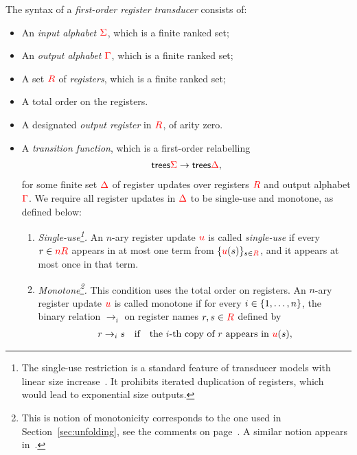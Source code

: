 \begin{definition}\label{def:stt}
The syntax of a \emph{first-order register transducer} consists of: 
\begin{itemize}
    \item An \emph{input alphabet ${\color{red}{\Sigma}}$}, which is a finite ranked set;
    \item An \emph{output alphabet ${\color{red}{\Gamma}}$}, which is a finite ranked set;
    \item A set ${{\color{red}{R}}}$ of \emph{registers}, which is a finite ranked set;
    \item A total order on the registers.
    \item A designated \emph{output register} in ${{\color{red}{R}}}$, of arity zero.
    \item A \emph{transition function}, which is a  first-order  relabelling
    \begin{align*}
      \mathsf {trees}{{\color{red}{\Sigma}}} \to \mathsf {trees}{{\color{red}{\Delta}}},
    \end{align*}for some finite set ${\color{red}{\Delta}}$ of  register updates over registers ${{\color{red}{R}}}$ and output alphabet ${\color{red}{\Gamma}}$. We require  all register updates in  ${\color{red}{\Delta}}$ to be single-use and monotone, as defined below:
    \begin{enumerate}
        \item \emph{Single-use\footnote{The  single-use restriction  is a standard feature of transducer models with linear size increase~\cite{bloem_comparison_2000, alurStreamingStringTransducers2011,alur2017streaming}.   It prohibits iterated duplication of registers, which would lead to exponential size outputs.    
        }.}  An $n$-ary register update ${\color{red}{u}}$ is  called  \emph{single-use} if   every $r \in {\color{red}{n {{\color{red}{R}}}}}$
        appears in at most one term from $\{{\color{red}{u}}(s)\}_{s \in {{\color{red}{R}}}}$, and it appears at most once in that term. 
        \item \emph{Monotone\footnote{This is notion of monotonicity corresponds to the one used in Section~\ref{sec:unfolding}, see the comments on page~\pageref{page:monotone-discussed}. A similar notion  appears in~\cite[p. 7]{bojanczykRegularFirstOrderList2018}.}.} This condition uses the total order on registers.  An $n$-ary  register update ${\color{red}{u}}$ is called monotone  if for every $i \in \{1,\ldots,n\}$, the binary relation $\to_i$ on register names $r,s \in {{\color{red}{R}}}$  defined by
        \begin{align*} 
            r \to_i s \quad \text{if} \quad  \text{the $i$-th copy of $r$ appears in $\ranked u(s)$},

\end{align*}
\end{enumerate}
\end{itemize}
\end{definition}
